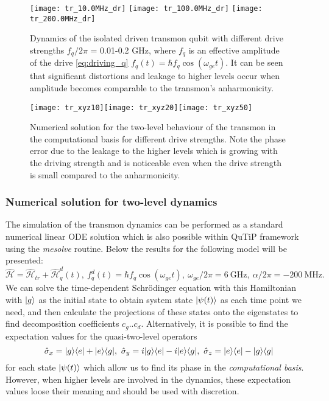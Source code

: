 \begin{figure}[h!]
\centering
\texttt{[image: tr\_10.0MHz\_dr]}
\texttt{[image: tr\_100.0MHz\_dr]}
\texttt{[image: tr\_200.0MHz\_dr]}
\caption{Dynamics of the isolated driven transmon qubit with different drive strengths $f_q/2\pi$ = 0.01-0.2 GHz, where $f_q$ is an effective amplitude of the drive \eqref{eq:driving_q} $f_q (t) = \hbar  f_q \cos(\omega_{ge} t)$. It can be seen that significant distortions and leakage to higher levels occur when amplitude becomes comparable to the transmon's anharmonicity.}
\label{fig:driven_tr}
\end{figure}

\begin{figure}[h!]
\centering
\texttt{[image: tr\_xyz10]}\texttt{[image: tr\_xyz20]}\texttt{[image: tr\_xyz50]}
\caption{Numerical solution for the two-level behaviour of the transmon in the computational basis for different drive strengths. Note the phase error due to the leakage to the higher levels which is growing with the driving strength and is noticeable even when the drive strength is small compared to the anharmonicity.}
\label{fig:xyz_tr}
\end{figure}

\subsubsection{Numerical solution for two-level dynamics}

The simulation of the transmon dynamics can be performed as a standard numerical linear ODE solution which is also possible within QuTiP framework using the \textit{mesolve} routine. Below the results for the following model will be presented:
\[
\mathcal{\hat H} = \mathcal{\hat H}_{tr}  +\mathcal{\hat H}_q^d(t),\ f_q^d(t) =\hbar f_q \cos(\omega_{ge}t),\ \omega_{ge}/2\pi = 6\ \text{GHz},\ \alpha/2\pi = - 200\ \text{MHz}.
\]
We can solve the time-dependent Schrödinger equation with this Hamiltonian with $\lvert g\rangle$ as the initial state to obtain system state $\lvert\psi(t)\rangle$ as each time point we need, and then calculate the projections of these states onto the eigenstates to find decomposition coefficients $c_{g}..c_{d}$. Alternatively, it is possible to  find the expectation values for the quasi-two-level operators
\[
\hat \sigma_x = \lvert g\rangle\langle e\rvert+\lvert e\rangle\langle g\rvert,\ \hat\sigma_y = i\lvert g\rangle\langle e\rvert - i\lvert e\rangle\langle g\rvert,\ \hat\sigma_z  = \lvert e\rangle\langle e\rvert-\lvert g\rangle\langle g\rvert
\]
for each state $\lvert\psi(t)\rangle$ which allow us to find its phase in the \textit{computational basis}. However, when higher levels are involved in the dynamics, these expectation values loose their meaning and should be used with discretion.

